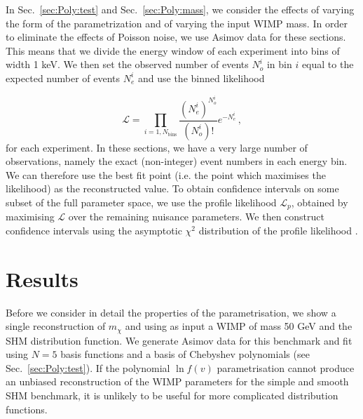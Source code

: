 In Sec.~\ref{sec:Poly:test} and Sec.~\ref{sec:Poly:mass}, we consider the effects of varying the form of the parametrization and of varying the input WIMP mass. In order to eliminate the effects of Poisson noise, we use Asimov data \cite{Cowan:2013} for these sections. This means that we divide the energy window of each experiment into bins of width 1 keV. We then set the observed number of events $N_{o}^{i}$ in bin $i$ equal to the expected number of events $N_{e}^{i}$ and use the binned likelihood

\begin{equation}
\label{eq:Poly:binnedL}
\mathcal{L} = \prod_{i = 1, N_\textrm{bins}} \frac{(N_e^i)^{N_o^i}}{(N_o^i)!}e^{-N_e^i}\,,
\end{equation}
for each experiment. In these sections, we have a very large number of observations, namely the exact (non-integer) event numbers in each energy bin. We can therefore use the best fit point (i.e. the point which maximises the likelihood) as the reconstructed value. To obtain confidence intervals on some subset of the full parameter space, we use the profile likelihood $\mathcal{L}_p$, obtained by maximising $\mathcal{L}$ over the remaining nuisance parameters. We then construct confidence intervals using the asymptotic $\chi^2$ distribution of the profile likelihood \cite{Wilks:1938}.



\section{Results}
\label{sec:Poly:results}

Before we consider in detail the properties of the parametrisation, we show a single reconstruction of $m_\chi$ and \sigmapsi using as input a WIMP of mass 50 GeV and the SHM distribution function. We generate Asimov data for this benchmark and fit using $N=5$ basis functions and a basis of Chebyshev polynomials (see Sec.~\ref{sec:Poly:test}). If the polynomial $\ln f(v)$ parametrisation cannot produce an unbiased reconstruction of the WIMP parameters for the simple and smooth SHM benchmark, it is unlikely to be useful for more complicated distribution functions.


